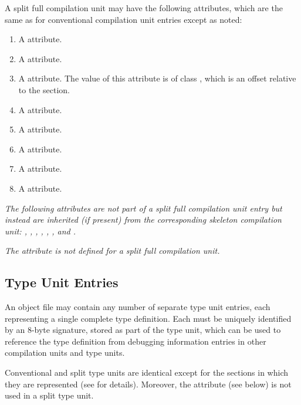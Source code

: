A split full compilation unit 
may have the following attributes, 
which are the same as for conventional compilation unit entries 
except as noted:
\begin{enumerate}[1. ]
\item A \DWATname{} attribute.
\item A \DWATlanguage{} attribute.
\item A \DWATmacros{} attribute.
The value of this attribute is of class \CLASSmacptr{}, which is 
an offset relative to the \dotdebugmacrodwo{} section.
        
\item A \DWATproducer{} attribute.        
\item A \DWATidentifiercase{} attribute.
\item A \DWATmainsubprogram{} attribute.
\item A \DWATentrypc{} attribute.
\item A \DWATuseUTFeight{} attribute.

\end{enumerate}

\textit{The following attributes are not part of a 
split full compilation unit entry but instead are inherited 
(if present) from the corresponding skeleton compilation unit: 
\DWATlowpc, \DWAThighpc, \DWATranges, \DWATstmtlist, \DWATcompdir, 
\DWATstroffsetsbase, \DWATaddrbase{} and 
\DWATrnglistsbase.}

\textit{The \DWATbasetypes{} attribute is not defined for a
split full compilation unit.}


\subsection{Type Unit Entries}
\label{chap:typeunitentries}
An object file may contain any number of separate type
unit entries, each representing a single complete type
definition. 
Each  must be uniquely identified by
an 8-byte signature, stored as part of the type unit, which
can be used to reference the type definition from debugging
information entries in other compilation units and type units.

Conventional and split type units are identical except for
the sections in which they are represented 
(see  for details).
Moreover, the \DWATstroffsetsbase{} attribute (see below) is not 
used in a split type unit.

